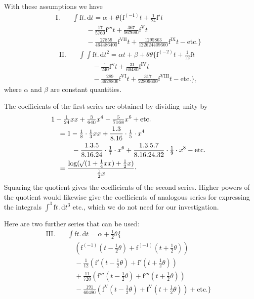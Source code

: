 \par With these assumptions we have
\[
\begin{aligned}
\mathrm{I.}\quad&\int\mathrm{f}t.\,\mathrm{d}t=\alpha+\theta\bigl\{\mathrm{f}^{(-1)}t+\tfrac1{24}\mathrm{f}'t\\
&\qquad-\tfrac{17}{5760}\mathrm{f}'''t+\tfrac{367}{967680}\mathrm{f}^{\mathrm{V}}t\\
&\qquad-\tfrac{27859}{464486400}\mathrm{f}^{\mathrm{VII}}t+\tfrac{1295803}{122624409600}\mathrm{f}^{\mathrm{IX}}t-\text{etc.}\bigr\}
\end{aligned}
\]
\[
\begin{aligned}
\mathrm{II.}\quad&\int\!\int\mathrm{f}t.\,\mathrm{d}t^2=\alpha t+\beta+\theta\theta\bigl\{\mathrm{f}^{(-2)}t+\tfrac1{12}\mathrm{f}t\\
&\qquad-\tfrac1{240}\mathrm{f}''t+\tfrac{31}{60480}\mathrm{f}^{\mathrm{IV}}t\\
&\qquad-\tfrac{289}{3628800}\mathrm{f}^{\mathrm{VI}}t+\tfrac{317}{22809600}\mathrm{f}^{\mathrm{VIII}}t-\text{etc.}\bigr\},
\end{aligned}
\]
where \(\alpha\) and \(\beta\) are constant quantities.
\par The coefficients of the first series are obtained by dividing unity by
\[
\begin{aligned}
&1-\tfrac1{24}xx+\tfrac3{640}x^4-\tfrac5{7168}x^6+\text{etc.}\\
&\quad=1-\tfrac18\cdot\tfrac13xx+\dfrac{1.3}{8.16}\cdot\tfrac15\cdot x^4\\
&\qquad\quad-\dfrac{1.3.5}{8.16.24}\cdot\tfrac17\cdot x^6+\dfrac{1.3.5.7}{8.16.24.32}\cdot\tfrac19\cdot x^8-\text{etc.}\\
&\quad=\dfrac{\log(\mathord{{}^{}\!\surd}(1+\tfrac14xx)+\tfrac12x)}{\tfrac12x}\mathpunct{\cdot}
\end{aligned}
\]
Squaring the quotient gives the coefficients of the second series. Higher powers of the quotient would likewise give the coefficients of analogous series for expressing the integrals \(\int^3\mathrm{f}t.\,\mathrm{d}t^3\) etc., which we do not need for our investigation.
\par Here are two further series that can be used:
\[
\begin{aligned}
\mathrm{III.}\quad&\int\mathrm{f}t.\,\mathrm{d}t=\alpha+\tfrac12\theta\bigl\{\\
&\quad(\mathrm{f}^{(-1)}(t-\tfrac12\theta)+\mathrm{f}^{(-1)}(t+\tfrac12\theta))\\
&\quad-\tfrac1{12}(\mathrm{f}'(t-\tfrac12\theta)+\mathrm{f}'(t+\tfrac12\theta))\\
&\quad+\tfrac{11}{720}(\mathrm{f}'''(t-\tfrac12\theta)+\mathrm{f}'''(t+\tfrac12\theta))\\
&\quad-\tfrac{191}{60480}(\mathrm{f}^{\mathrm{V}}(t-\tfrac12\theta)+\mathrm{f}^{\mathrm{V}}(t+\tfrac12\theta))+\text{etc.}\bigr\}
\end{aligned}
\]
